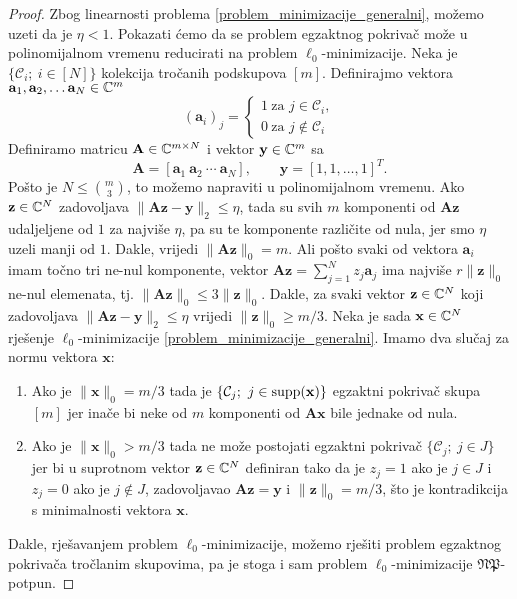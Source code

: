 \documentclass[a4paper,twoside,12pt]{memoir} %
\newcommand{\vect}[1]{\mathbf{#1}}
\renewcommand{\vec}{\vect}
\newcommand{\supp}{\text{\normalfont{supp}}}
\newcommand{\norm}[1]{\|{#1}\|}
\begin{document}
\begin{proof}
    Zbog linearnosti problema \eqref{problem_minimizacije_generalni}, mo\v{z}emo uzeti da je $\eta < 1$. Pokazati \'cemo da se problem egzaktnog pokriva\v{c} mo\v{z}e u polinomijalnom vremenu reducirati na problem $\ell_0$-minimizacije. Neka je $\{\mathcal{C}_i;\ i \in [N]\}$ kolekcija tro\v{c}anih podskupova $[m]$. Definirajmo vektora $\vec a_1, \vec a_2,\dots \vec a_N \in \C^m$
    \begin{equation*}
        (\vec a_i)_j = 
        \begin{cases*}
            1\ \text{za } j \in \mathcal{C}_i,\\
            0\ \text{za } j \not\in \mathcal{C}_i
        \end{cases*}
    \end{equation*}
    Definiramo matricu $\vec A \in \C^{m \times N}$ i vektor $\vec y \in \C^m$ sa
    \begin{equation*}
        \vec A = [\vec a_1\ \vec a_2\ \cdots \ \vec a_N], \qquad \vec y = [1,1, \dots, 1]^T.
    \end{equation*}
    Po\v{s}to je $N \leq {m \choose 3}$, to mo\v{z}emo napraviti u polinomijalnom vremenu. Ako $\vec z \in \C^N$ zadovoljava $\norm{\vec{Az}-\vec y}_2 \leq \eta$, tada su svih $m$ komponenti od $\vec{Az}$ udaljeljene od $1$ za najvi\v{s}e $\eta$, pa su te komponente razli\v{c}ite od nula, jer smo $\eta$ uzeli manji od $1$. Dakle, vrijedi $\norm{\vec{Az}}_0 = m$. Ali po\v{s}to svaki od vektora $\vec a_i$ imam to\v{c}no tri ne-nul komponente, vektor $\vec{Az}=\sum_{j=1}^N z_j \vec a_j$ ima najvi\v{s}e $r \norm{\vec z}_0$ ne-nul elemenata, tj. $\norm{\vec{Az}}_0 \leq 3 \norm{\vec{z}}_0$. Dakle, za svaki vektor $\vec z \in \C^N$ koji zadovoljava $\norm{\vec{Az}-\vec y}_2 \leq \eta$ vrijedi $\norm{\vec z}_0 \geq m/3$. Neka je sada $\vec x \in \C^N$ rje\v{s}enje $\ell_0$-minimizacije \eqref{problem_minimizacije_generalni}. Imamo dva slu\v{c}aj za normu vektora $\vec x$:
    \begin{enumerate}
        \item Ako je $\norm{\vec{x}}_0 = m/3$ tada je $\{\mathcal{C}_j;\ j \in \supp(\vec x)\}$ egzaktni pokriva\v{c} skupa $[m]$ jer ina\v{c}e bi neke od $m$ komponenti od $\vec{Ax}$ bile jednake od nula.
        \item Ako je $\norm{\vec{x}}_0 > m/3$ tada ne mo\v{z}e postojati egzaktni pokriva\v{c} $\{\mathcal{C}_j;\ j \in J\}$ jer bi u suprotnom vektor $\vec z \in \C^N$ definiran tako da je $z_j = 1$ ako je $j \in J$ i $z_j = 0$ ako je $j \not \in J$, zadovoljavao $\vec{Az}=\vec y$ i $\norm{\vec z}_0=m/3$, \v{s}to je kontradikcija s minimalnosti vektora $\vec x$.
    \end{enumerate}
    Dakle, rje\v{s}avanjem problem $\ell_0$-minimizacije, mo\v{z}emo rje\v{s}iti problem egzaktnog pokriva\v{c}a tro\v{c}lanim skupovima, pa je stoga i sam problem $\ell_0$-minimizacije $\mathfrak{NP}$-potpun.
\end{proof}
\end{document}
